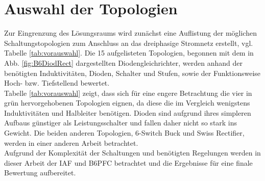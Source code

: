 \section{Auswahl der Topologien}
Zur Eingrenzung des Lösungsraums wird zunächst eine Auflistung der möglichen Schaltungstopologien zum Anschluss an das dreiphasige Stromnetz erstellt, vgl. Tabelle \ref{tab:vorauswahl}. Die 15 aufgelisteten Topologien, begonnen mit dem in Abb. \ref{fig:B6DiodRect} dargestellten Diodengleichrichter, werden anhand der benötigten Induktivitäten, Dioden, Schalter und Stufen, sowie der Funktionsweise Hoch- bzw. Tiefstellend bewertet.\\
Tabelle \ref{tab:vorauswahl} zeigt, dass sich für eine engere Betrachtung die vier in grün hervorgehobenen Topologien eignen, da diese die im Vergleich wenigstens Induktivitäten und Halbleiter benötigen. Dioden sind aufgrund ihres simpleren Aufbaus günstiger als Leistungsschalter und fallen daher nicht so stark ins Gewicht. Die beiden anderen Topologien, 6-Switch Buck und Swiss Rectifier, werden in einer anderen Arbeit betrachtet.\\
Aufgrund der Komplexität der Schaltungen und benötigten Regelungen werden in dieser Arbeit der \gls{IAF} und \gls{B6PFC} betrachtet und die Ergebnisse für eine finale Bewertung aufbereitet.

